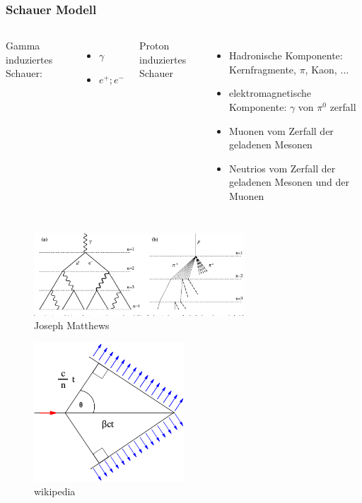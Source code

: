 \documentclass[aspectratio=1610, professionalfonts, 9pt]{beamer}
\begin{document}
  \begin{frame}
    \frametitle{Schauer Modell}
    \begin{columns}
      Gamma induziertes Schauer:
      \begin{itemize}
        \item $\gamma$
        \item $e^+ ; e^-$
      \end{itemize}
      Proton induziertes Schauer
      \begin{itemize}
        \item Hadronische Komponente: Kernfragmente, $\pi$, Kaon, $\dots$
        \item elektromagnetische Komponente: $\gamma$ von $\pi^0$ zerfall
        \item Muonen vom Zerfall der geladenen Mesonen
        \item Neutrios vom Zerfall der geladenen Mesonen und der Muonen
      \end{itemize}
    \end{columns}
    \begin{figure}
      \includegraphics[width=0.7\textwidth]{pictures/Heitler.png}
      \caption{Joseph Matthews}
      \label{}
    \end{figure}
  \end{frame}

  \begin{frame}
    \begin{figure}
      \includegraphics[width=0.5\textwidth]{pictures/CherenkovRadiation.png}
      \caption{wikipedia}
      \label{}
    \end{figure}
  \end{frame}
\end{document}
